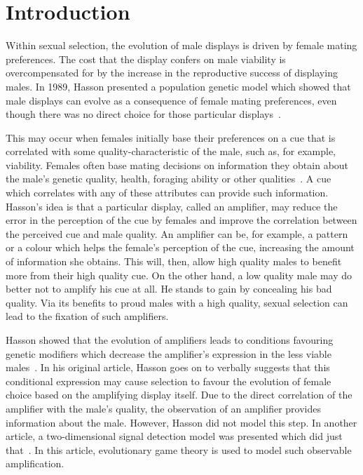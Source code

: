 \documentclass[a4paper,12pt]{article}
\numberwithin{equation}{section}
\begin{document}
\tableofcontents

\newpage


\section{Introduction}
\label{sec:Introduction}

Within sexual selection, the evolution of male displays is driven by female mating preferences. The cost that the display confers on male viability is overcompensated for by the increase in the reproductive success of displaying males. In 1989, Hasson presented a population genetic model which showed that male displays can evolve as a consequence of female mating preferences, even though there was no direct choice for those particular displays~\cite{Hasson1989}.

This may occur when females initially base their preferences on a cue that is correlated with some quality-characteristic of the male, such as, for example, viability. Females often base mating decisions on information they obtain about the male's genetic quality, health, foraging ability or other qualities~\cite{Jennions1997}. A cue which correlates with any of these attributes can provide such information. Hasson's idea is that a particular display, called an amplifier, may reduce the error in the perception of the cue by females and improve the correlation between the perceived cue and male quality. An amplifier can be, for example, a pattern or a colour which helps the female's perception of the cue, increasing the amount of information she obtains. This will, then, allow high quality males to benefit more from their high quality cue. On the other hand, a low quality male may do better not to amplify his cue at all. He stands to gain by concealing his bad quality. Via its benefits to proud males with a high quality, sexual selection can lead to the fixation of such amplifiers.

Hasson showed that the evolution of amplifiers leads to conditions favouring genetic modifiers which decrease the amplifier's expression in the less viable males~\cite{Hasson1989}. In his original article, Hasson goes on to verbally suggests that this conditional expression may cause selection to favour the evolution of female choice based on the amplifying display itself. Due to the direct correlation of the amplifier with the male's quality, the observation of an amplifier provides information about the male. However, Hasson did not model this step. In another article, a two-dimensional signal detection model was presented which did just that~\cite{Bogaardt2014}. In this article, evolutionary game theory is used to model such observable amplification.
\end{document}
